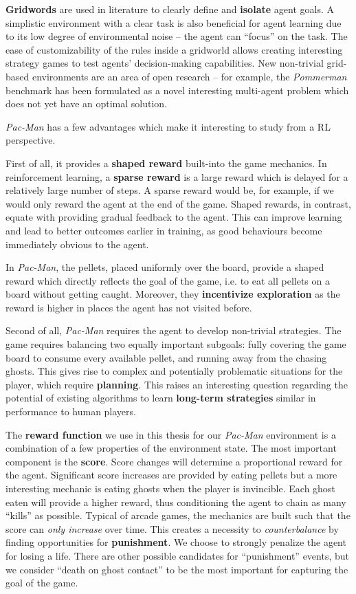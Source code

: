 \textbf{Gridwords} are used in literature to clearly define and \textbf{isolate} agent goals.
A simplistic environment with a clear task is also beneficial for agent learning due to its low degree of environmental noise -- the agent can ``focus'' on the task.
The ease of customizability of the rules inside a gridworld allows creating interesting strategy games to test agents’ decision-making capabilities.
New non-trivial grid-based environments are an area of open research -- for example, the \emph{Pommerman} benchmark \cite{pommerman-paper} has been formulated as a novel interesting multi-agent problem which does not yet have an optimal solution.

\emph{Pac-Man} has a few advantages which make it interesting to study from a RL perspective.

First of all, it provides a \textbf{shaped reward} built-into the game mechanics.
In reinforcement learning, a \textbf{sparse reward} is a large reward which is delayed for a relatively large number of steps.
A sparse reward would be, for example, if we would only reward the agent at the end of the game.
Shaped rewards, in contrast, equate with providing gradual feedback to the agent.
This can improve learning and lead to better outcomes earlier in training, as good behaviours become immediately obvious to the agent.

In \emph{Pac-Man}, the pellets, placed uniformly over the board, provide a shaped reward which directly reflects the goal of the game, i.e. to eat all pellets on a board without getting caught.
Moreover, they \textbf{incentivize exploration} as the reward is higher in places the agent has not visited before.

Second of all, \emph{Pac-Man} requires the agent to develop non-trivial strategies.
The game requires balancing two equally important subgoals: fully covering the game board to consume every available pellet, and running away from the chasing ghosts.
This gives rise to complex and potentially problematic situations for the player, which require \textbf{planning}.
This raises an interesting question regarding the potential of existing algorithms to learn \textbf{long-term strategies} similar in performance to human players.

The \textbf{reward function} we use in this thesis for our \emph{Pac-Man} environment is a combination of a few properties of the environment state.
The most important component is the \textbf{score}.
Score changes will determine a proportional reward for the agent.
Significant score increases are provided by eating pellets but a more interesting mechanic is eating ghosts when the player is invincible.
Each ghost eaten will provide a higher reward, thus conditioning the agent to chain as many ``kills'' as possible.
Typical of arcade games, the mechanics are built such that the score can \emph{only increase} over time.
This creates a necessity to \emph{counterbalance} by finding opportunities for \textbf{punishment}.
We choose to strongly penalize the agent for losing a life.
There are other possible candidates for ``punishment'' events, but we consider ``death on ghost contact'' to be the most important for capturing the goal of the game.


